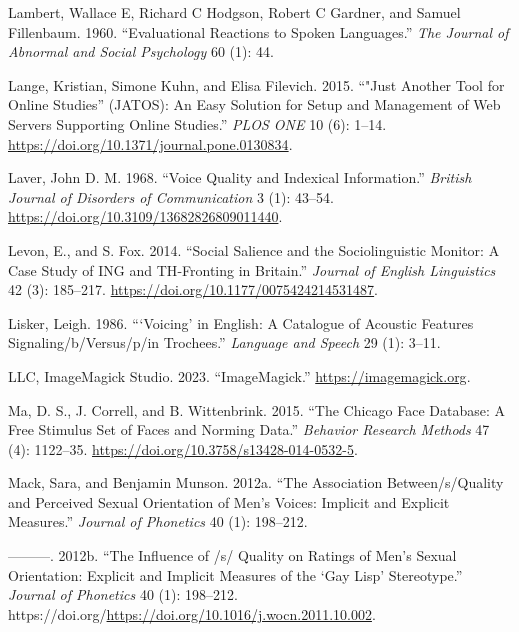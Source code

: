 \documentclass[
  letterpaper,
  DIV=11,
  numbers=noendperiod]{scrartcl}
\newlength{\cslhangindent}
\newenvironment{CSLReferences}[2] %
 {\begin{list}{}{%
  \setlength{\itemindent}{0pt}
  \setlength{\leftmargin}{0pt}
  \setlength{\parsep}{0pt}
  \ifodd #1
   \setlength{\leftmargin}{\cslhangindent}
   \setlength{\itemindent}{-1\cslhangindent}
  \fi
  \setlength{\itemsep}{#2\baselineskip}}}
 {\end{list}}
\begin{document}
\begin{CSLReferences}{1}{0}
Lambert, Wallace E, Richard C Hodgson, Robert C Gardner, and Samuel
Fillenbaum. 1960. {``Evaluational Reactions to Spoken Languages.''}
\emph{The Journal of Abnormal and Social Psychology} 60 (1): 44.

Lange, Kristian, Simone Kuhn, and Elisa Filevich. 2015. {``"Just Another
Tool for Online Studies'' (JATOS): An Easy Solution for Setup and
Management of Web Servers Supporting Online Studies.''} \emph{PLOS ONE}
10 (6): 1--14. \url{https://doi.org/10.1371/journal.pone.0130834}.

Laver, John D. M. 1968. {``Voice Quality and Indexical Information.''}
\emph{British Journal of Disorders of Communication} 3 (1): 43--54.
\url{https://doi.org/10.3109/13682826809011440}.

Levon, E., and S. Fox. 2014. {``Social Salience and the Sociolinguistic
Monitor: {A} Case Study of {ING} and {TH}-Fronting in Britain.''}
\emph{Journal of English Linguistics} 42 (3): 185--217.
\url{https://doi.org/10.1177/0075424214531487}.

Lisker, Leigh. 1986. {``{`Voicing'} in English: A Catalogue of Acoustic
Features Signaling/b/Versus/p/in Trochees.''} \emph{Language and Speech}
29 (1): 3--11.

LLC, ImageMagick Studio. 2023. {``ImageMagick.''}
\url{https://imagemagick.org}.

Ma, D. S., J. Correll, and B. Wittenbrink. 2015. {``The Chicago Face
Database: A Free Stimulus Set of Faces and Norming Data.''}
\emph{Behavior Research Methods} 47 (4): 1122--35.
\url{https://doi.org/10.3758/s13428-014-0532-5}.

Mack, Sara, and Benjamin Munson. 2012a. {``The Association
Between/s/Quality and Perceived Sexual Orientation of Men's Voices:
Implicit and Explicit Measures.''} \emph{Journal of Phonetics} 40 (1):
198--212.

---------. 2012b. {``The Influence of /s/ Quality on Ratings of Men's
Sexual Orientation: Explicit and Implicit Measures of the {`Gay Lisp'}
Stereotype.''} \emph{Journal of Phonetics} 40 (1): 198--212.
https://doi.org/\url{https://doi.org/10.1016/j.wocn.2011.10.002}.


\end{CSLReferences}
\end{document}
